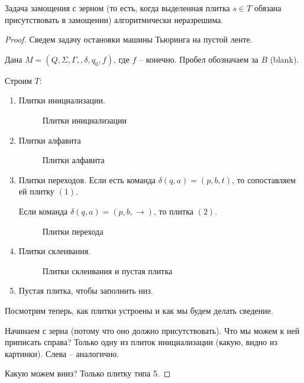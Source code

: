 \begin{thm}
    Задача замощения с зерном (то есть, когда выделенная плитка $ s \in T $ обязана присутствовать в замощении) алгоритмически неразрешима.
\end{thm}
\begin{proof}
    Сведем задачу остановки машины Тьюринга на пустой ленте.

    Дана $ M = (Q, \Sigma, \Gamma, , \delta, q_0, f)$, где $ f $ -- конечно. Пробел обозначаем за $B$ (blank).

    Строим $T$:
    \begin{enumerate}
        \item Плитки инициализации.
\begin{figure}[ht]
    \centering
	\caption{Плитки инициализации}
    \label{fig:init-tails}
\end{figure}
        \item  Плитки алфавита
\begin{figure}[ht]
    \centering
    \caption{Плитки алфавита}
    \label{fig:alphabet-tails}
\end{figure}
        \item Плитки переходов. 
			Если есть команда $ \delta(q, a) = (p, b, t) $, то сопоставляем
			ей плитку $ (1)$.

			Если команда $ \delta(q, a) = (p, b, \rightarrow) $, то плитка  $ (2)$.
\begin{figure}[ht]
    \centering
    \caption{Плитки перехода}
    \label{fig:delta-tails}
\end{figure}
        \item Плитки склеивания.
\begin{figure}[h!]
    \centering
    \caption{Плитки склеивания и пустая плитка}
    \label{fig:bonding-tails}
\end{figure}
        \item Пустая плитка, чтобы заполнить низ. 
    \end{enumerate}

    Посмотрим теперь, как плитки устроены и как мы будем делать сведение.

    Начинаем с зерна (потому что оно должно присутствовать). Что мы можем к ней приписать справа?
    Только одну из плиток инициализации (какую, видно из картинки). Слева -- аналогично.

    Какую можем вниз? Только плитку типа 5.


\end{proof}
